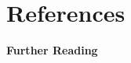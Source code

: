 \documentclass[aspectratio=169,xcolor={svgnames}]{beamer}
\begin{document}
\section{References}
\begin{frame}[allowframebreaks]{\insertsectionhead}

  \textbf{Further Reading}
  \furtherreading
\end{frame}

\end{document}

